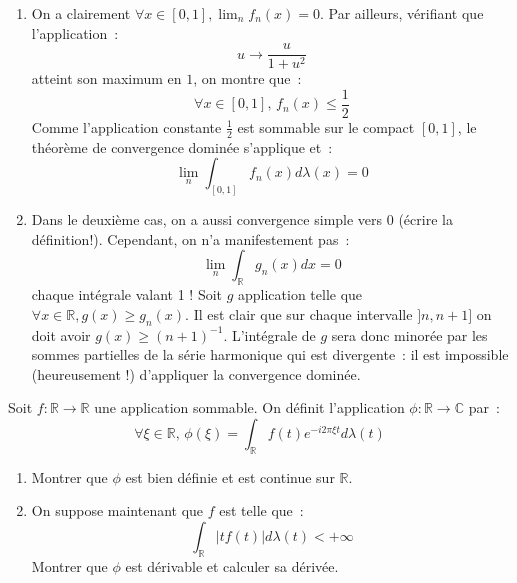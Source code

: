 \documentclass[a4paper, 12pt]{amsart}
\begin{document}
\begin{enumerate}
\item On a clairement $\forall x \in [0,1], \lim_n f_n(x) = 0$. Par ailleurs,
vérifiant que 
l'application~:
\[
u \to \frac{u}{1+u^2}
\]
atteint son maximum en $1$, on montre que~:
\[
\forall x \in [0,1], \, f_n(x) \leq \frac{1}{2}
\]
Comme l'application constante $\frac{1}{2}$ est sommable sur le compact $[0,1]$,
le théorème de
convergence dominée s'applique et~:
\[
\lim_n \int_{[0,1]} f_n(x) d \lambda(x) = 0
\]
\item Dans le deuxième cas, on a aussi convergence simple vers 0 (écrire la
définition!). Cependant, on n'a manifestement pas~:
\[
\lim_n \int_{\mathbb{R}} g_n(x) dx = 0
\]
chaque intégrale valant 1 !
Soit $g$ application telle que $\forall x \in \mathbb{R}, g(x) \geq
g_n(x)$. Il est clair que sur chaque intervalle $]n, n+1]$ on doit
avoir $g(x) \geq (n+1)^{-1}$. L'intégrale de $g$ sera donc minorée par
les sommes partielles de la série harmonique qui est divergente~: il
est impossible (heureusement !) d'appliquer la convergence dominée.
\end{enumerate}
\begin{fex}
Soit $f : \mathbb{R} \to \mathbb{R}$ une application sommable. On 
définit l'application $\phi : \mathbb{R} \to \mathbb{C}$ par~:
\[
\forall \xi \in \mathbb{R}, \, \phi(\xi) = \int_{\mathbb{R}} f(t) e^{-i 2 \pi
\xi t} d \lambda(t)
\]
\begin{enumerate}
\item Montrer que $\phi$ est bien définie et est continue sur $\mathbb{R}$.
\item On suppose maintenant que $f$ est telle que~:
\[
\int_{\mathbb{R}} | t f(t) | d \lambda(t) < +\infty
\]
Montrer que $\phi$ est dérivable et calculer sa dérivée.
\end{enumerate}
\end{fex}
\end{document}
